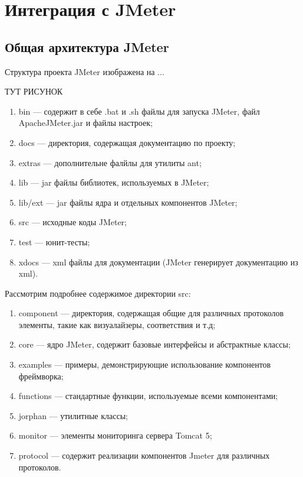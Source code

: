 \section{Интеграция с JMeter}

\subsection{Общая архитектура JMeter}

Структура проекта JMeter изображена на ...

ТУТ РИСУНОК

\begin{enumerate}
\item bin --- содержит в себе .bat и .sh файлы для запуска JMeter, файл ApacheJMeter.jar и файлы настроек;
\item docs --- директория, содержащая документацию по проекту;
\item extras --- дополнительне фалйлы для утилиты ant;
\item lib --- jar файлы библиотек, используемых в JMeter;
\item lib/ext --- jar файлы ядра и отдельных компонентов JMeter;
\item src --- исходные коды JMeter;
\item test --- юнит-тесты;
\item xdocs --- xml файлы для документации (JMeter генерирует документацию из xml).
\end{enumerate}

Рассмотрим подробнее содержимое директории src:

\begin{enumerate}
\item component --- директория, содержащая общие для различных протоколов элементы, такие как визуалайзеры,
соответствия и т.д;
\item core --- ядро JMeter, содержит базовые интерфейсы и абстрактные классы;
\item examples --- примеры, демонстрирующие использование компонентов фреймворка;
\item functions --- стандартные функции, используемые всеми компонентами;
\item jorphan --- утилитные классы;
\item monitor --- элементы мониторинга сервера Tomcat 5;
\item protocol --- содержит реализации компонентов Jmeter для различных протоколов.
\end{enumerate}

